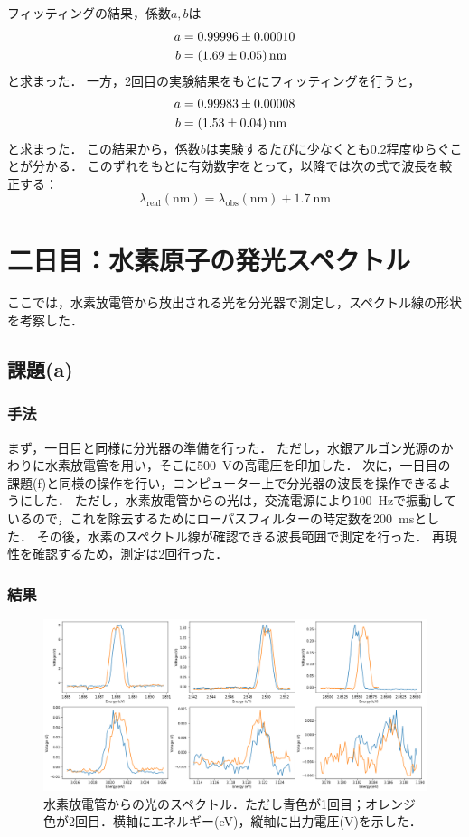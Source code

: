 \documentclass[titlepage]{jsarticle}
\begin{document}
フィッティングの結果，係数$a,b$は
\begin{align}
  a &= 0.99996 \pm 0.00010 \\
  b &= \SI[separate-uncertainty]{1.69 \pm 0.05}{\nm}
\end{align}
と求まった．
一方，2回目の実験結果をもとにフィッティングを行うと，
\begin{align}
  a &= 0.99983 \pm 0.00008 \\
  b &= \SI[separate-uncertainty]{1.53 \pm 0.04}{\nm}
\end{align}
と求まった．
この結果から，係数$b$は実験するたびに少なくとも0.2程度ゆらぐことが分かる．
このずれをもとに有効数字をとって，以降では次の式で波長を較正する：
\begin{equation}
  \lambda_{\mathrm{real}}(\si{\nm}) = \lambda_{\mathrm{obs}}(\si{\nm}) + \SI{1.7}{\nm}  
\end{equation}


\section{二日目：水素原子の発光スペクトル}
ここでは，水素放電管から放出される光を分光器で測定し，スペクトル線の形状を考察した．

\subsection{課題(a)}
\subsubsection{手法}
まず，一日目と同様に分光器の準備を行った．
ただし，水銀アルゴン光源のかわりに水素放電管を用い，そこに\SI{500}{V}の高電圧を印加した．
次に，一日目の課題(f)と同様の操作を行い，コンピューター上で分光器の波長を操作できるようにした．
ただし，水素放電管からの光は，交流電源により\SI{100}{Hz}で振動しているので，これを除去するためにローパスフィルターの時定数を\SI{200}{\ms}とした．
その後，水素のスペクトル線が確認できる波長範囲で測定を行った．
再現性を確認するため，測定は2回行った．

\subsubsection{結果}

\begin{figure}[htbp]
  \centering
  \includegraphics[width=15cm]{Hydrogen.png}
  \caption{水素放電管からの光のスペクトル．ただし青色が1回目；オレンジ色が2回目．横軸にエネルギー(\si{\eV})，縦軸に出力電圧(\si{V})を示した．}
  \label{fig:Hydrogen}
\end{figure}
\end{document}
